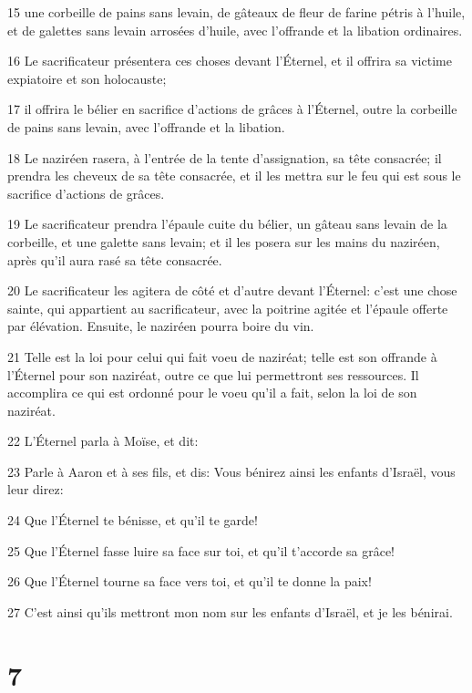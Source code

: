 \par 15 une corbeille de pains sans levain, de gâteaux de fleur de farine pétris à l'huile, et de galettes sans levain arrosées d'huile, avec l'offrande et la libation ordinaires.
\par 16 Le sacrificateur présentera ces choses devant l'Éternel, et il offrira sa victime expiatoire et son holocauste;
\par 17 il offrira le bélier en sacrifice d'actions de grâces à l'Éternel, outre la corbeille de pains sans levain, avec l'offrande et la libation.
\par 18 Le naziréen rasera, à l'entrée de la tente d'assignation, sa tête consacrée; il prendra les cheveux de sa tête consacrée, et il les mettra sur le feu qui est sous le sacrifice d'actions de grâces.
\par 19 Le sacrificateur prendra l'épaule cuite du bélier, un gâteau sans levain de la corbeille, et une galette sans levain; et il les posera sur les mains du naziréen, après qu'il aura rasé sa tête consacrée.
\par 20 Le sacrificateur les agitera de côté et d'autre devant l'Éternel: c'est une chose sainte, qui appartient au sacrificateur, avec la poitrine agitée et l'épaule offerte par élévation. Ensuite, le naziréen pourra boire du vin.
\par 21 Telle est la loi pour celui qui fait voeu de naziréat; telle est son offrande à l'Éternel pour son naziréat, outre ce que lui permettront ses ressources. Il accomplira ce qui est ordonné pour le voeu qu'il a fait, selon la loi de son naziréat.
\par 22 L'Éternel parla à Moïse, et dit:
\par 23 Parle à Aaron et à ses fils, et dis: Vous bénirez ainsi les enfants d'Israël, vous leur direz:
\par 24 Que l'Éternel te bénisse, et qu'il te garde!
\par 25 Que l'Éternel fasse luire sa face sur toi, et qu'il t'accorde sa grâce!
\par 26 Que l'Éternel tourne sa face vers toi, et qu'il te donne la paix!
\par 27 C'est ainsi qu'ils mettront mon nom sur les enfants d'Israël, et je les bénirai.

\chapter{7}

